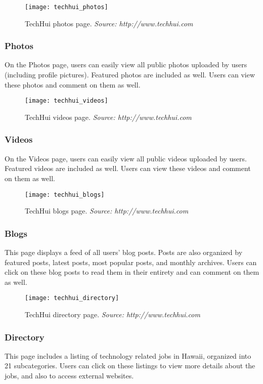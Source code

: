 \begin{figure}[h]
\centering
\texttt{[image: techhui\_photos]}
\caption{TechHui photos page. \textit{Source: http://www.techhui.com}}
\end{figure}
\subsubsection{Photos}
On the Photos page, users can easily view all public photos uploaded by users (including profile pictures). Featured photos are included as well. Users can view these photos and comment on them as well. 

\begin{figure}[h]
\centering
\texttt{[image: techhui\_videos]}
\caption{TechHui videos page. \textit{Source: http://www.techhui.com}}
\end{figure}
\subsubsection{Videos}
On the Videos page, users can easily view all public videos uploaded by users. Featured videos are included as well. Users can view these videos and comment on them as well. 

\begin{figure}[h]
\centering
\texttt{[image: techhui\_blogs]}
\caption{TechHui blogs page. \textit{Source: http://www.techhui.com}}
\end{figure}
\subsubsection{Blogs}
This page displays a feed of all users' blog posts. Posts are also organized by featured posts, latest posts, most popular posts, and monthly archives. Users can click on these blog posts to read them in their entirety and can comment on them as well. 

\begin{figure}[h]
\centering
\texttt{[image: techhui\_directory]}
\caption{TechHui directory page. \textit{Source: http://www.techhui.com}}
\end{figure}
\subsubsection{Directory}
This page includes a listing of technology related jobs in Hawaii, organized into 21 subcategories. Users can click on these listings to view more details about the jobs, and also to access external websites.

